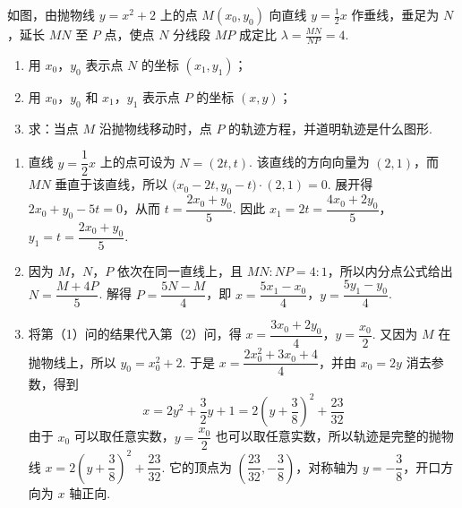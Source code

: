 \documentclass[UTF8,a4paper,oneside,11pt]{ctexbook}
\begin{document}
\begin{problem}

如图，由抛物线 \(y=x^2+2\) 上的点 \(M(x_0,y_0)\) 向直线 \(y=\frac{1}{2}x\) 作垂线，垂足为 \(N\)，延长 \(MN\) 至 \(P\) 点，使点 \(N\) 分线段 \(MP\) 成定比 \(\lambda=\frac{MN}{NP}=4\).

\begin{enumerate}
\item 用 \(x_0\)，\(y_0\) 表示点 \(N\) 的坐标 \((x_1, y_1)\)；
\item 用 \(x_0\)，\(y_0\) 和 \(x_1\)，\(y_1\) 表示点 \(P\) 的坐标 \((x, y)\)；
\item 求：当点 \(M\) 沿抛物线移动时，点 \(P\) 的轨迹方程，并道明轨迹是什么图形.
\end{enumerate}

\begin{solution}
\begin{enumerate}
\item 直线 \(y=\dfrac12x\) 上的点可设为 \(N=(2t,t)\). 该直线的方向向量为 \((2,1)\)，而 \(MN\) 垂直于该直线，所以 \(\bigl(x_0-2t,y_0-t\bigr)\cdot(2,1)=0\). 展开得 \(2x_0+y_0-5t=0\)，从而 \(t=\dfrac{2x_0+y_0}{5}\). 因此 \(x_1=2t=\dfrac{4x_0+2y_0}{5}\)，\(y_1=t=\dfrac{2x_0+y_0}{5}\).
\item 因为 \(M\)，\(N\)，\(P\) 依次在同一直线上，且 \(MN:NP=4:1\)，所以内分点公式给出 \(N=\dfrac{M+4P}{5}\). 解得 \(P=\dfrac{5N-M}{4}\)，即 \(x=\dfrac{5x_1-x_0}{4}\)，\(y=\dfrac{5y_1-y_0}{4}\).
\item 将第（1）问的结果代入第（2）问，得 \(x=\dfrac{3x_0+2y_0}{4}\)，\(y=\dfrac{x_0}{2}\). 又因为 \(M\) 在抛物线上，所以 \(y_0=x_0^2+2\). 于是 \(x=\dfrac{2x_0^2+3x_0+4}{4}\)，并由 \(x_0=2y\) 消去参数，得到
\[
x=2y^2+\frac32y+1=2\left(y+\frac38\right)^2+\frac{23}{32}
\]
由于 \(x_0\) 可以取任意实数，\(y=\dfrac{x_0}{2}\) 也可以取任意实数，所以轨迹是完整的抛物线 \(x=2\left(y+\dfrac38\right)^2+\dfrac{23}{32}\). 它的顶点为 \(\left(\dfrac{23}{32},-\dfrac38\right)\)，对称轴为 \(y=-\dfrac38\)，开口方向为 \(x\) 轴正向.
\end{enumerate}
\end{solution}
\end{problem}

\end{document}
